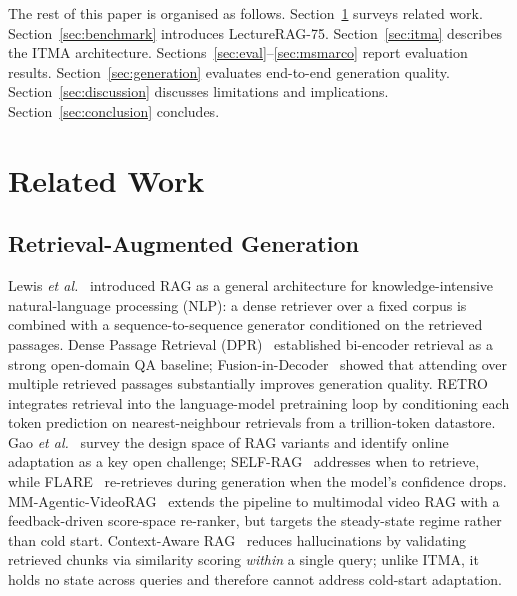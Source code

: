 \documentclass[journal]{IEEEtran}
\begin{document}
The rest of this paper is organised as follows.  Section~\ref{sec:related}
surveys related work.  Section~\ref{sec:benchmark} introduces LectureRAG-75.
Section~\ref{sec:itma} describes the ITMA architecture.
Sections~\ref{sec:eval}--\ref{sec:msmarco} report evaluation results.
Section~\ref{sec:generation} evaluates end-to-end generation quality.
Section~\ref{sec:discussion} discusses limitations and implications.
Section~\ref{sec:conclusion} concludes.

\section{Related Work}
\label{sec:related}

\subsection{Retrieval-Augmented Generation}
Lewis \emph{et al.}~\cite{lewis2020rag} introduced RAG as a general
architecture for knowledge-intensive natural-language processing (NLP):
a dense retriever over a fixed corpus is combined with a sequence-to-sequence
generator conditioned on the retrieved passages.
Dense Passage Retrieval (DPR)~\cite{karpukhin2020dpr} established bi-encoder
retrieval as a strong open-domain QA baseline; Fusion-in-Decoder~\cite{izacard2021leveraging}
showed that attending over multiple retrieved passages substantially improves
generation quality.  RETRO~\cite{borgeaud2022retro} integrates retrieval into
the language-model pretraining loop by conditioning each token prediction on
nearest-neighbour retrievals from a trillion-token datastore.  Gao
\emph{et al.}~\cite{gao2024ragsurv} survey the design space of RAG variants
and identify online adaptation as a key open challenge;
SELF-RAG~\cite{asai2024selfrag} addresses when to retrieve, while
FLARE~\cite{jiang2023active} re-retrieves during generation when the
model's confidence drops.  MM-Agentic-VideoRAG~\cite{swaroop2026mtap}
extends the pipeline to multimodal video RAG with a feedback-driven
score-space re-ranker, but targets the steady-state regime rather than cold
start.  Context-Aware RAG~\cite{carag2025} reduces hallucinations by
validating retrieved chunks via similarity scoring \emph{within} a single
query; unlike ITMA, it holds no state across queries and therefore cannot
address cold-start adaptation.
\end{document}
